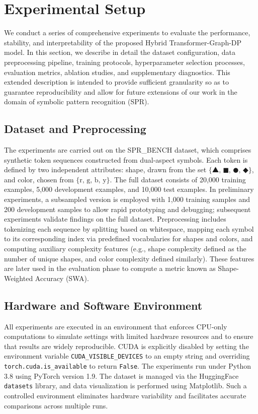 \documentclass{article}
\begin{document}
\section{Experimental Setup}
We conduct a series of comprehensive experiments to evaluate the performance, stability, and interpretability of the proposed Hybrid Transformer-Graph-DP model. In this section, we describe in detail the dataset configuration, data preprocessing pipeline, training protocols, hyperparameter selection processes, evaluation metrics, ablation studies, and supplementary diagnostics. This extended description is intended to provide sufficient granularity so as to guarantee reproducibility and allow for future extensions of our work in the domain of symbolic pattern recognition (SPR).

\subsection{Dataset and Preprocessing}
The experiments are carried out on the SPR\_BENCH dataset, which comprises synthetic token sequences constructed from dual-aspect symbols. Each token is defined by two independent attributes: shape, drawn from the set \(\{\text{▲, ■, ●, ◆}\}\), and color, chosen from \(\{\text{r, g, b, y}\}\). The full dataset consists of 20,000 training examples, 5,000 development examples, and 10,000 test examples. In preliminary experiments, a subsampled version is employed with 1,000 training samples and 200 development samples to allow rapid prototyping and debugging; subsequent experiments validate findings on the full dataset. Preprocessing includes tokenizing each sequence by splitting based on whitespace, mapping each symbol to its corresponding index via predefined vocabularies for shapes and colors, and computing auxiliary complexity features (e.g., shape complexity defined as the number of unique shapes, and color complexity defined similarly). These features are later used in the evaluation phase to compute a metric known as Shape-Weighted Accuracy (SWA).

\subsection{Hardware and Software Environment}
All experiments are executed in an environment that enforces CPU-only computations to simulate settings with limited hardware resources and to ensure that results are widely reproducible. CUDA is explicitly disabled by setting the environment variable \texttt{CUDA\_VISIBLE\_DEVICES} to an empty string and overriding \texttt{torch.cuda.is\_available} to return \texttt{False}. The experiments run under Python 3.8 using PyTorch version 1.9. The dataset is managed via the HuggingFace \texttt{datasets} library, and data visualization is performed using Matplotlib. Such a controlled environment eliminates hardware variability and facilitates accurate comparisons across multiple runs.
\end{document}
